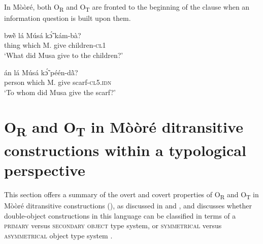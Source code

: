\documentclass[output=paper]{langsci/langscibook}
\begin{document}
In Mòòré, both O\textsubscript{R} and O\textsubscript{T} are fronted to the beginning of the clause when an information question is built upon them. 

\ea
\label{ex:45.pacchiarotti}
\gll bw\`{\~{e}}    l\'{a}    M\'{u}s\'{a}  kɔ̃́  k\'{a}m-b\`{a}?  \\
thing    which    M.  give  children-\textsc{cl1}\\
\glt `What did Musa give to the children?'
\z

\ea
\label{ex:46.pacchiarotti}
\gll \'{a}n    l\'{a}    M\'{u}s\'{a}  kɔ̃́  péén-d\`{\~{a}}? \\
person  which    M.  give  scarf-\textsc{cl5.idn}\\
\glt `To whom did Musa give the scarf?'
\z

\section{O\textsubscript{R} and O\textsubscript{T} in Mòòré ditransitive constructions within a typological perspective}\label{§6:or.pacchiarotti}

This section offers a summary of the overt and covert properties of O\textsubscript{R} and O\textsubscript{T} in Mòòré ditransitive constructions (), as discussed in  and , and discusses whether double-object constructions in this language can be classified in terms of a \textsc{primary} versus \textsc{secondary object }\citep{dryer1986} type system, or \textsc{symmetrical} versus \textsc{asymmetrical} object type system \citep{bresnanmoshi1990}.
\end{document}
